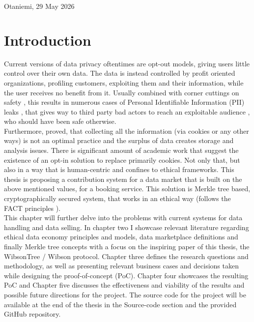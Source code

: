 \documentclass[english, 12pt, a4paper, sci, utf8, a-2b, online]{aaltothesis}
\theoremstyle{change}
\theoremstyle{theoremstyle}
\begin{document}
\vspace{5cm}
Otaniemi, 29 May 2026\\


\newpage


\thesistableofcontents

\cleardoublepage

\section{Introduction}
\label{sec:intro}

\thispagestyle{empty}

Current versions of data privacy oftentimes are opt-out models, giving users little control over their own data. The data is instead controlled by profit oriented organizations, profiling customers, exploiting them and their information, while the user receives no benefit from it. Usually combined with corner cuttings on safety \cite{vagle2020cybersecurity}\cite{kopp2017cyber}\cite{zhang2023market}, this results in numerous cases of Personal Identifiable Information (PII) leaks \cite{dao2021alternative}, that gives way to third party bad actors to reach an exploitable audience \cite{langvardt2024media}\cite{cross2025examining}, who should have been safe otherwise.\\
Furthermore, \cite{chen2023studying} proved, that collecting all the information (via cookies or any other ways) is not an optimal practice and the surplus of data creates storage and analysis issues.
There is significant amount of academic work that suggest the existence of an opt-in solution to replace primarily cookies. Not only that, but also in a way that is human-centric and confines to ethical frameworks.
This thesis is proposing a contribution system for a data market that is built on the above mentioned values, for a booking service.
This solution is Merkle tree based, cryptographically secured system, that works in an ethical way (follows the FACT principles \cite{sohail2024data}).\\
This chapter will further delve into the problems with current systems for data handling and data selling. In chapter two I showcase relevant literature regarding ethical data economy principles and models, data marketplace definitions and finally Merkle tree concepts with a focus on the inspiring paper of this thesis, the WibsonTree / Wibson protocol. Chapter three defines the research questions and methodology, as well as presenting relevant business cases and decisions taken while designing the proof-of-concept (PoC). Chapter four showcases the resulting PoC and Chapter five discusses the effectiveness and viability of the results and possible future directions for the project. The source code for the project will be available at the end of the thesis in the Source-code section and the provided GitHub repository.
\end{document}
